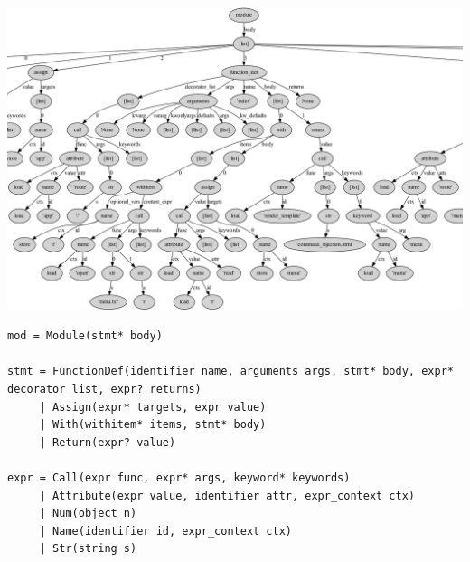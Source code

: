 \begin{frame}[plain]
  \includegraphics[width=\textwidth]{graphics/AST}
\end{frame}

\begin{frame}
  \begin{lstlisting}[style=default]
mod = Module(stmt* body)

stmt = FunctionDef(identifier name, arguments args, stmt* body, expr* decorator_list, expr? returns)
     | Assign(expr* targets, expr value)
     | With(withitem* items, stmt* body)
     | Return(expr? value)
       
expr = Call(expr func, expr* args, keyword* keywords)
     | Attribute(expr value, identifier attr, expr_context ctx)
     | Num(object n)
     | Name(identifier id, expr_context ctx)
     | Str(string s)   
  \end{lstlisting}
\end{frame}
